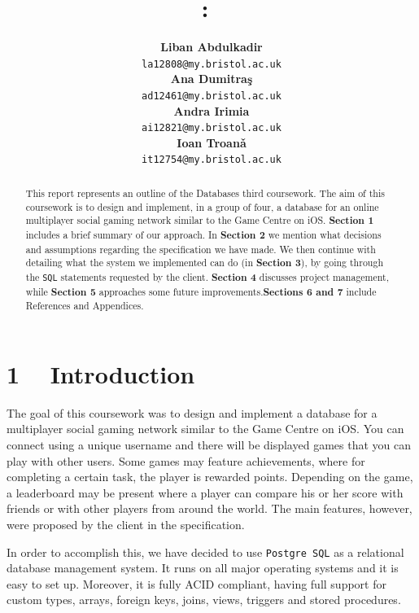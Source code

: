 \documentclass{article}
\title{
\vspace{0.2in}
\textmd{\textbf{\hmwkClass:\ \hmwkTitle}}\\
\vspace{0.5in}
\textmd{\hmwkDueDate}
\vspace{1.5in}
}
\author{
  \textbf{Liban Abdulkadir}\\
  \texttt{la12808@my.bristol.ac.uk}\\
  \textbf{Ana Dumitra\c{s}}\\
  \texttt{ad12461@my.bristol.ac.uk}\\
  \textbf{Andra Irimia}\\
  \texttt{ai12821@my.bristol.ac.uk}\\
  \textbf{Ioan Troan\v{a}}\\
  \texttt{it12754@my.bristol.ac.uk}\\
\vspace{1in}
}
\date{}
\begin{document}
\maketitle





\begin{abstract}
This report represents an outline of the Databases third coursework. The aim of this coursework is to design and implement, in a group of four, a database for an online multiplayer social gaming network similar to the Game Centre on iOS. \textbf{Section 1} includes a brief summary of our approach. In \textbf{Section 2} we mention what decisions and assumptions regarding the specification we have made. We then continue with detailing what the system we implemented can do (in \textbf{Section 3}), by going through the \texttt{SQL} statements requested by the client. \textbf{Section 4} discusses project management, while  \textbf{Section 5} approaches some future improvements.\textbf{Sections 6 and 7} include References and Appendices.

\end{abstract}


\section{1  ~ Introduction}
\par {The goal of this coursework was to design and implement a database for a multiplayer social gaming network similar to the Game Centre on iOS. You can connect using a unique username and there will be displayed games that you can play with other users. Some games may feature achievements, where for completing a certain task, the player is rewarded points. Depending on the game, a leaderboard may be present where a player can compare his or her score with friends or with other players from around the world. The main features, however, were proposed by the client in the specification.} \\
\par {In order to accomplish this, we have decided to use \texttt {Postgre SQL} as a relational database management system. It runs on all major operating systems and it is easy to set up. Moreover, it is fully ACID compliant, having full support for custom types, arrays, foreign keys, joins, views, triggers and stored procedures. \cite{link1}}
\end{document}

